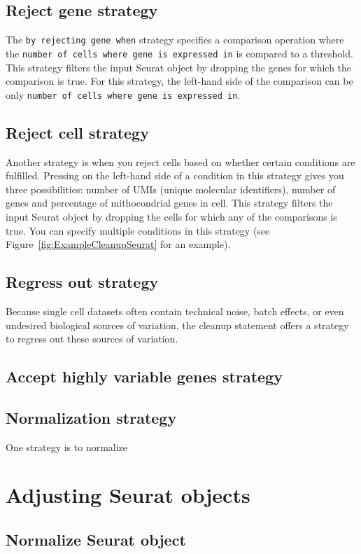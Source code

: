 \subsection{Reject gene strategy}
The \texttt{by rejecting gene when} strategy specifies a comparison operation where the
\texttt{number of cells where gene is expressed in} is compared to a threshold.
This strategy filters the input Seurat object by dropping the genes for which
the comparison is true. For this strategy, the left-hand side of the comparison can be
only \texttt{number of cells where gene is expressed in}.

\subsection{Reject cell strategy}
Another strategy is when you reject cells based on whether certain conditions are fulfilled.
Pressing \keys{\ctrl+\space} on the left-hand side of a condition in this strategy gives you
three possibilities: number of UMIs (unique molecular identifiers), number of genes and
percentage of mithocondrial genes in cell. This strategy filters the input Seurat object
by dropping the cells for which any of the comparisons is true. You can specify multiple
conditions in this strategy (see Figure~\ref{fig:ExampleCleanupSeurat} for an example).

\subsection{Regress out strategy}
Because single cell datasets often contain technical noise, batch effects, or even undesired
biological sources of variation, the cleanup statement offers a strategy to regress out
these sources of variation.

\subsection{Accept highly variable genes strategy}
\subsection{Normalization strategy}
One strategy is to normalize

\section{Adjusting Seurat objects}
\subsection{Normalize Seurat object}
